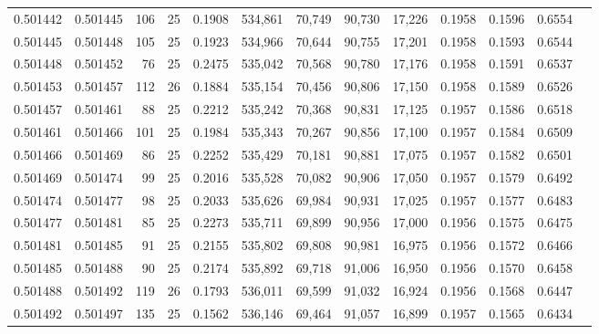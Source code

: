 \begin{tabular}{rrrrrrrrrrrrr}
0.501442 & 0.501445 & 106 &  25 &                                     0.1908 & 534,861 &  70,749 &  90,730 &  17,226 & 0.1958 & 0.1596 & 0.6554 \\
0.501445 & 0.501448 & 105 &  25 &                                     0.1923 & 534,966 &  70,644 &  90,755 &  17,201 & 0.1958 & 0.1593 & 0.6544 \\
0.501448 & 0.501452 &  76 &  25 &                                     0.2475 & 535,042 &  70,568 &  90,780 &  17,176 & 0.1958 & 0.1591 & 0.6537 \\
0.501453 & 0.501457 & 112 &  26 &                                     0.1884 & 535,154 &  70,456 &  90,806 &  17,150 & 0.1958 & 0.1589 & 0.6526 \\
0.501457 & 0.501461 &  88 &  25 &                                     0.2212 & 535,242 &  70,368 &  90,831 &  17,125 & 0.1957 & 0.1586 & 0.6518 \\
0.501461 & 0.501466 & 101 &  25 &                                     0.1984 & 535,343 &  70,267 &  90,856 &  17,100 & 0.1957 & 0.1584 & 0.6509 \\
0.501466 & 0.501469 &  86 &  25 &                                     0.2252 & 535,429 &  70,181 &  90,881 &  17,075 & 0.1957 & 0.1582 & 0.6501 \\
0.501469 & 0.501474 &  99 &  25 &                                     0.2016 & 535,528 &  70,082 &  90,906 &  17,050 & 0.1957 & 0.1579 & 0.6492 \\
0.501474 & 0.501477 &  98 &  25 &                                     0.2033 & 535,626 &  69,984 &  90,931 &  17,025 & 0.1957 & 0.1577 & 0.6483 \\
0.501477 & 0.501481 &  85 &  25 &                                     0.2273 & 535,711 &  69,899 &  90,956 &  17,000 & 0.1956 & 0.1575 & 0.6475 \\
0.501481 & 0.501485 &  91 &  25 &                                     0.2155 & 535,802 &  69,808 &  90,981 &  16,975 & 0.1956 & 0.1572 & 0.6466 \\
0.501485 & 0.501488 &  90 &  25 &                                     0.2174 & 535,892 &  69,718 &  91,006 &  16,950 & 0.1956 & 0.1570 & 0.6458 \\
0.501488 & 0.501492 & 119 &  26 &                                     0.1793 & 536,011 &  69,599 &  91,032 &  16,924 & 0.1956 & 0.1568 & 0.6447 \\
0.501492 & 0.501497 & 135 &  25 &                                     0.1562 & 536,146 &  69,464 &  91,057 &  16,899 & 0.1957 & 0.1565 & 0.6434 \\

\end{tabular}
